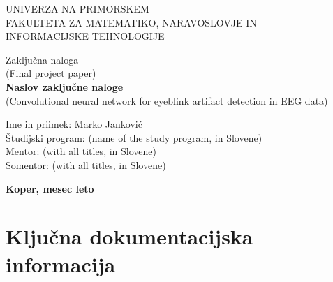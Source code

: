 \documentclass[12pt,a4paper,titlepage,openany]{report}
\begin{document}
\pagestyle{empty}
\begin{center}
\noindent \large UNIVERZA NA PRIMORSKEM\\
\large FAKULTETA ZA MATEMATIKO, NARAVOSLOVJE IN\\
INFORMACIJSKE TEHNOLOGIJE


\normalsize
\vspace{5.5cm}
Zaklju\v cna naloga\\
(Final project paper)\\
\textbf{\large Naslov zaklju\v cne naloge}\\
\normalsize
(Convolutional neural network for eyeblink artifact detection in EEG data)\\
\end{center}

\begin{flushleft}
\vspace{5cm}
\noindent Ime in priimek: Marko Janković
\\
\noindent \v Studijski program: (name of the study program, in Slovene)
\\
\noindent Mentor: (with all titles, in Slovene)
\\
\noindent Somentor: (with all titles, in Slovene)
\\
\end{flushleft}

\vspace{4cm}
\begin{center}
\large \textbf{Koper, mesec leto}
\end{center}
\newpage

\pagestyle{fancy}

\section*{Klju\v cna dokumentacijska informacija}
\end{document}
